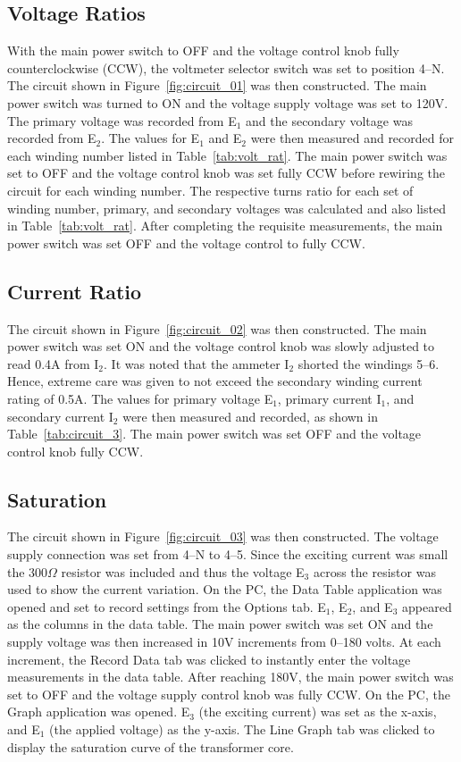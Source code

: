 \documentclass{article}
\begin{document}
\subsection{Voltage Ratios}

\label{part1} With the main power switch to OFF and the voltage control knob
fully counterclockwise (CCW), the voltmeter selector switch was set to position
4--N. The circuit shown in Figure~\ref{fig:circuit_01}  was then constructed.
The main power switch was turned to ON and the voltage supply voltage was set
to 120V. The primary voltage was recorded from E$_1$ and the secondary voltage
was recorded from E$_2$.  The values for E$_1$ and E$_2$ were then measured and
recorded for each winding number listed in Table~\ref{tab:volt_rat}. The main
power switch was set to OFF and the voltage control knob was set fully CCW
before rewiring the circuit for each winding number. The respective turns ratio
for each set of winding number, primary, and secondary voltages was calculated
and also listed in Table~\ref{tab:volt_rat}. After completing the requisite
measurements, the main power switch was set OFF and the voltage control to
fully CCW.

\subsection{Current Ratio}

\label{part2} The circuit shown in Figure~\ref{fig:circuit_02} was then
constructed. The main power switch was set ON and the voltage control knob was
slowly adjusted to read 0.4A from I$_2$. It was noted that the ammeter I$_2$
shorted the windings 5--6.  Hence, extreme care was given to not exceed the
secondary winding current rating of 0.5A. The values for primary voltage E$_1$,
primary current I$_1$, and secondary current I$_2$ were then measured and
recorded, as shown in Table~\ref{tab:circuit_3}.  The main power switch was set
OFF and the voltage control knob fully CCW.

\subsection{Saturation}

\label{part3} The circuit shown in Figure~\ref{fig:circuit_03} was then
constructed. The voltage supply connection was set from 4--N to 4--5. Since the
exciting current was small the 300$\Omega$ resistor was included and thus the
voltage E$_3$ across the resistor was used to show the current variation. On
the PC, the Data Table application was opened and set to record settings from
the Options tab. E$_1$, E$_2$, and E$_3$ appeared as the columns in the data
table. The main power switch was set ON and the supply voltage was then
increased in 10V increments from 0--180 volts. At each increment, the Record
Data tab was clicked to instantly enter the voltage measurements in the data
table. After reaching 180V, the main power switch was set to OFF and the
voltage supply control knob was fully {CCW}. On the {PC}, the Graph application
was opened.  E$_3$ (the exciting current) was set as the x-axis, and E$_1$ (the
applied voltage) as the y-axis. The Line Graph tab was clicked to display the
saturation curve of the transformer core.
\end{document}
